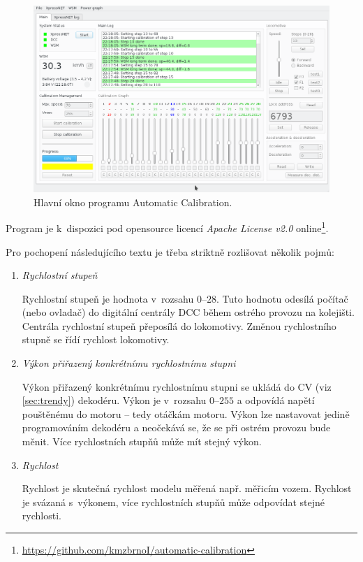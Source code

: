 \begin{figure}[h]
\includegraphics[width=\textwidth]{data/ac_progress.png}
\caption{Hlavní okno programu Automatic Calibration.}
\label{fig:ac-gui}
\end{figure}

Program je k~dispozici pod opensource licencí \textit{Apache License v2.0}
online\footnote{\url{https://github.com/kmzbrnoI/automatic-calibration}}.

Pro pochopení následujícího textu je třeba striktně rozlišovat několik pojmů:

\begin{enumerate}
\item \textit{Rychlostní stupeň}

Rychlostní stupeň je hodnota v~rozsahu $0$--$28$. Tuto hodnotu odesílá počítač
(nebo ovladač) do digitální centrály DCC během ostrého provozu na kolejišti.
Centrála rychlostní stupeň přeposílá do lokomotivy. Změnou rychlostního stupně
se řídí rychlost lokomotivy.

\item \textit{Výkon přiřazený konkrétnímu rychlostnímu stupni}

Výkon přiřazený konkrétnímu rychlostnímu stupni se ukládá do CV (viz
\ref{sec:trendy}) dekodéru. Výkon je v~rozsahu $0$--$255$ a odpovídá napětí
pouštěnému do motoru -- tedy otáčkám motoru. Výkon lze nastavovat jedině
programováním dekodéru a neočekává se, že se při ostrém provozu bude měnit.
Více rychlostních stupňů může mít stejný výkon.

\item \textit{Rychlost}

Rychlost je skutečná rychlost modelu měřená např. měřicím vozem. Rychlost
je svázaná s~výkonem, více rychlostních stupňů může odpovídat stejné rychlosti.

\end{enumerate}


